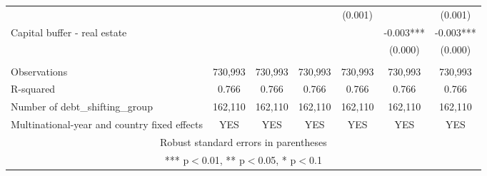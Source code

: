 \begin{tabular}{lcccccc}
 &  &  &  & (0.001) &  & (0.001) \\
Capital buffer - real estate &  &  &  &  & -0.003*** & -0.003*** \\
 &  &  &  &  & (0.000) & (0.000) \\
 &  &  &  &  &  &  \\
Observations & 730,993 & 730,993 & 730,993 & 730,993 & 730,993 & 730,993 \\
R-squared & 0.766 & 0.766 & 0.766 & 0.766 & 0.766 & 0.766 \\
Number of debt\_shifting\_group & 162,110 & 162,110 & 162,110 & 162,110 & 162,110 & 162,110 \\
 Multinational-year and country fixed effects & YES & YES & YES & YES & YES & YES \\ \hline
\multicolumn{7}{c}{ Robust standard errors in parentheses} \\
\multicolumn{7}{c}{ *** p$<$0.01, ** p$<$0.05, * p$<$0.1} \\
\end{tabular}
